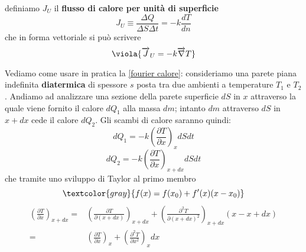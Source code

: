 \noindent
definiamo \(J_U\) il \textbf{flusso di calore per unità di superficie} 
\[ 
J_U \equiv \frac{\Delta Q}{\Delta S \Delta t} = - k \frac{dT}{dn}
\]
che in forma vettoriale si può scrivere
\begin{equation}
	\viola{\overrightarrow{J}_U = -k \overrightarrow{\nabla}T}
\end{equation}

\noindent
Vediamo come usare in pratica la \ref{fourier calore}: consideriamo una parete piana indefinita \textbf{diatermica} di spessore \(s\) posta tra due ambienti a temperature \(T_1\) e \(T_2\). Andiamo ad analizzare una sezione della parete superficie \(dS\) in \(x\) attraverso la quale viene fornito il calore \(dQ_1\) alla massa \(dm\); intanto \(dm\) attraverso \(dS\) in \(x + dx\) cede il calore \(dQ_2\). Gli scambi di calore saranno quindi:
\[ 
dQ_1 = -k \left(\frac{\partial T}{\partial x}\right)_x dS dt
\]
\[ 
dQ_2 = -k \left(\frac{\partial T}{\partial x}\right)_{x+dx} dS dt 
\]
che tramite uno sviluppo di Taylor al primo membro
\[ 
\textcolor{gray}{f(x) = f(x_0) + f'(x)(x-x_0)}
\]
\begin{align*}
	\left(\frac{\partial T}{\partial x}\right)_{x+dx} =& \left(\frac{\partial T}{\partial (x+dx)}\right)_{x+dx} + \left(\frac{\partial^2 T}{\partial (x + dx)^2}\right)_{x+dx}(x - x +dx) \\
	=& \left(\frac{\partial T}{\partial x}\right)_x + \left(\frac{\partial^2 T}{\partial x^2}\right)_{x}dx
\end{align*}


